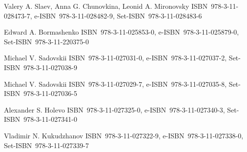 \documentclass[english,ngerman]{book}%
\theoremstyle{dgdef}
\theoremstyle{dgthm}
\begin{document}

\begin{advertisement}
{Valery A. Slaev, Anna G. Chunovkina, Leonid A. Mironovsky}
{ISBN~978-3-11-028473-7, e-ISBN~978-3-11-028482-9, Set-ISBN~978-3-11-028483-6}

{Edward A. Bormashenko}
{ISBN~978-3-11-025853-0, e-ISBN~978-3-11-025879-0, Set-ISBN~978-3-11-220375-0}

{Michael V. Sadovskii}
{ISBN~978-3-11-027031-0, e-ISBN~978-3-11-027037-2, Set-ISBN~978-3-11-027038-9}

{Michael V. Sadovskii}
{ISBN~978-3-11-027029-7, e-ISBN~978-3-11-027035-8, Set-ISBN~978-3-11-027036-5}

{Alexander S. Holevo}
{ISBN~978-3-11-027325-0, e-ISBN~978-3-11-027340-3, Set-ISBN~978-3-11-027341-0}

{Vladimir N. Kukudzhanov}
{ISBN~978-3-11-027322-9, e-ISBN~978-3-11-027338-0, Set-ISBN~978-3-11-027339-7}

\end{advertisement}


\maketitle
\end{document}

